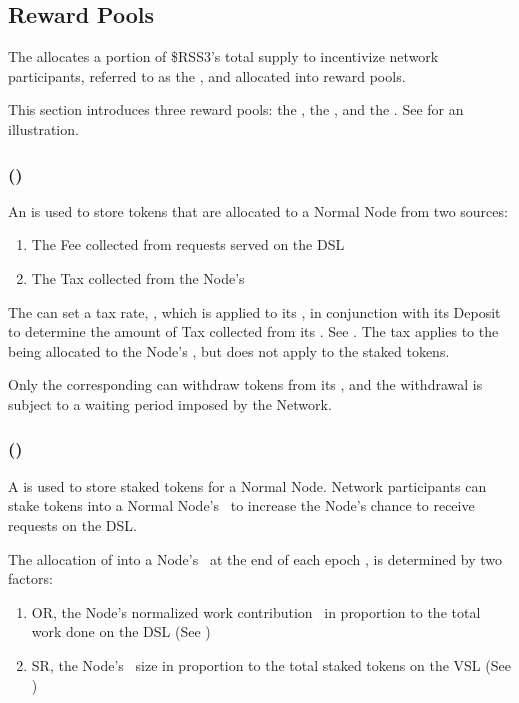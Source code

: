 \subsection{Reward Pools}
\label{subsec:reward_pools}

The  allocates a portion of \$RSS3's total supply to incentivize network participants, referred to as the ,
and allocated into reward pools.

This section introduces three reward pools: the , the , and the . See  for an illustration.

\subsubsection{ (\operationPool)}
\label{subsubsec:operation_pool}

An  is used to store tokens that are allocated to a Normal Node from two sources:
\begin{enumerate}
    \item The \gls{Fee} collected from requests served on the \gls{DSL}
    \item The \gls{Tax} collected from the Node's \stakingPool
\end{enumerate}

The  can set a tax rate, \taxRate, which is applied to its \stakingPool, in conjunction with its \gls{Deposit} to determine the amount of \gls{Tax} collected from its \stakingPool.
See .
The tax applies to the  being allocated to the Node's \stakingPool, but does not apply to the staked tokens.

Only the corresponding  can withdraw tokens from its \operationPool, and the withdrawal is subject to a waiting period imposed by the Network.

\subsubsection{ (\stakingPool)}
\label{subsubsec:staking_pool}

A  is used to store staked tokens for a Normal Node. Network participants can stake tokens into a Normal Node's \stakingPool\ to increase the Node's chance to receive requests on the \gls{DSL}.

The allocation of  into a Node's \stakingPool\ at the end of each epoch \epoch, is determined by two factors:
\begin{enumerate}
    \item \gls{OR}, the Node's normalized work contribution \work\ in proportion to the total work done on the \gls{DSL} (See )
    \item \gls{SR}, the Node's \stakingPool\ size in proportion to the total staked tokens on the \gls{VSL} (See )
\end{enumerate}

